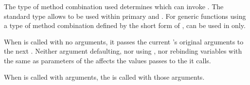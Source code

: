 The type of method combination used determines which 
can invoke .  The standard 
 type allows  
to be used within primary  and .
%  
%  
%  
%                                                                    
%  
%
For generic functions using a type of method combination defined by
the short form of ,
 can be used in  only.
 
When  is called with no arguments, it passes the
current 's original arguments to the next .  Neither
argument defaulting, nor using , nor rebinding variables
with the same  as parameters of the  affects the values
 passes to the  it calls.
 
 
When  is called with arguments, the 
 is called with those arguments.
 
